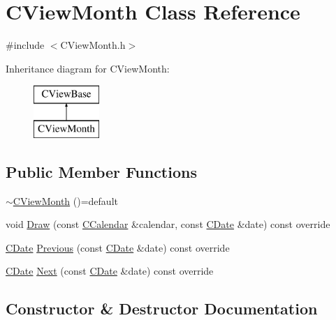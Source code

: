 \hypertarget{class_c_view_month}{}\section{C\+View\+Month Class Reference}
\label{class_c_view_month}


{\ttfamily \#include $<$C\+View\+Month.\+h$>$}

Inheritance diagram for C\+View\+Month\+:\begin{figure}[H]
\begin{center}
\leavevmode
\includegraphics[height=2.000000cm]{class_c_view_month}
\end{center}
\end{figure}
\subsection*{Public Member Functions}
\begin{DoxyCompactItemize}
\item 
\mbox{\hyperlink{class_c_view_month_afaa51a2b2d21e1765618d10c56fa8fcd}{$\sim$\+C\+View\+Month}} ()=default
\item 
void \mbox{\hyperlink{class_c_view_month_acfed5c2bd785ee77f5528539a46f743c}{Draw}} (const \mbox{\hyperlink{class_c_calendar}{C\+Calendar}} \&calendar, const \mbox{\hyperlink{class_c_date}{C\+Date}} \&date) const override
\item 
\mbox{\hyperlink{class_c_date}{C\+Date}} \mbox{\hyperlink{class_c_view_month_ad945457c5bf0dbd491facee6a0852714}{Previous}} (const \mbox{\hyperlink{class_c_date}{C\+Date}} \&date) const override
\item 
\mbox{\hyperlink{class_c_date}{C\+Date}} \mbox{\hyperlink{class_c_view_month_a61677174b4ffadff768792deeef52b5e}{Next}} (const \mbox{\hyperlink{class_c_date}{C\+Date}} \&date) const override
\end{DoxyCompactItemize}


\subsection{Constructor \& Destructor Documentation}
\mbox{\label{class_c_view_month_afaa51a2b2d21e1765618d10c56fa8fcd}} 
